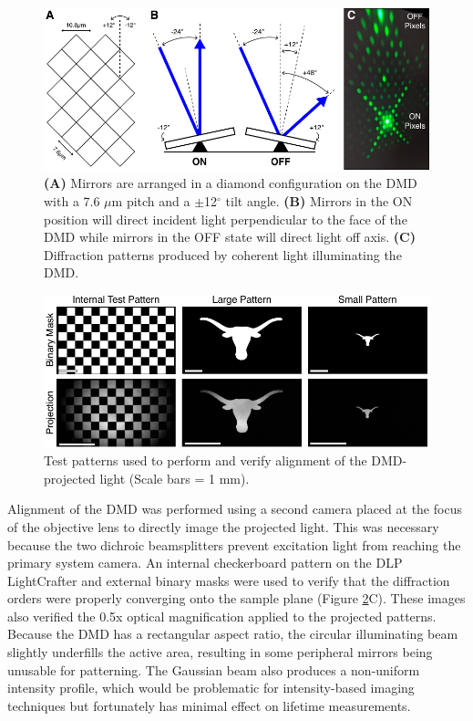 \begin{figure}
    \includegraphics{figures/chapter_2/dmdmirror.pdf}
    \caption {
        \label{fig:dmdmirror}
        \textbf{(A)} Mirrors are arranged in a diamond configuration on the DMD with a 7.6 $\mu$m pitch and a $\pm$12$^\circ$ tilt angle. \textbf{(B)} Mirrors in the ON position will direct incident light perpendicular to the face of the DMD while mirrors in the OFF state will direct light off axis. \textbf{(C)} Diffraction patterns produced by coherent light illuminating the DMD.
    }
\end{figure}

\begin{figure}
    \includegraphics{figures/chapter_2/dmdalignment.pdf}
    \caption {
        \label{fig:dmdalignment}
        Test patterns used to perform and verify alignment of the DMD-projected light (Scale bars = 1 mm).
    }
\end{figure}

Alignment of the DMD was performed using a second camera placed at the focus of the objective lens to directly image the projected light. This was necessary because the two dichroic beamsplitters prevent excitation light from reaching the primary system camera. An internal checkerboard pattern on the DLP LightCrafter and external binary masks were used to verify that the diffraction orders were properly converging onto the sample plane (Figure \ref{fig:dmdalignment}C). These images also verified the 0.5x optical magnification applied to the projected patterns. Because the DMD has a rectangular aspect ratio, the circular illuminating beam slightly underfills the active area, resulting in some peripheral mirrors being unusable for patterning. The Gaussian beam also produces a non-uniform intensity profile, which would be problematic for intensity-based imaging techniques but fortunately has minimal effect on lifetime measurements.

